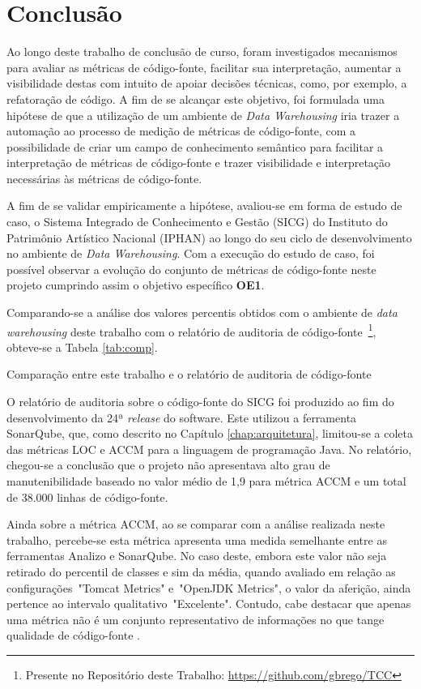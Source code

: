 \chapter{Conclusão}


Ao longo deste trabalho de conclusão de curso, foram investigados mecanismos para avaliar as métricas de código-fonte, facilitar sua interpretação, aumentar a visibilidade destas com intuito de apoiar decisões técnicas, como, por exemplo, a refatoração de código. A fim de se alcançar este objetivo, foi formulada uma hipótese de que a utilização de um ambiente de \textit{Data Warehousing} iria trazer a automação ao processo de medição de métricas de código-fonte, com a possibilidade de criar um campo de conhecimento semântico para facilitar a interpretação de métricas de código-fonte e trazer visibilidade e interpretação necessárias às métricas de código-fonte.

A fim de se validar empiricamente a hipótese, avaliou-se em forma de estudo de caso, o Sistema Integrado de Conhecimento e Gestão (SICG) do Instituto do Patrimônio Artístico Nacional (IPHAN) ao longo do seu ciclo de desenvolvimento no ambiente de \textit{Data Warehousing}. Com a execução do estudo de caso, foi possível observar a evolução do conjunto de métricas de código-fonte neste projeto cumprindo assim o objetivo específico \textbf{OE1}.

Comparando-se a análise dos valores percentis obtidos com o ambiente de \textit{data warehousing} deste trabalho com o relatório de auditoria de código-fonte~\footnote{Presente no Repositório deste Trabalho: \url{https://github.com/gbrego/TCC}}, obteve-se a Tabela \ref{tab:comp}.

\begin{table}[!ht]
\centering

\caption{Comparação entre este trabalho e o relatório de auditoria de código-fonte}
\label{tab:comp}
\end{table}
\FloatBarrier

O relatório de auditoria sobre o código-fonte do SICG foi produzido ao fim do desenvolvimento da 24ª \textit{release} do software. Este utilizou a ferramenta SonarQube, que, como descrito no Capítulo \ref{chap:arquitetura}, limitou-se a coleta das métricas LOC e ACCM para a linguagem de programação Java. No relatório, chegou-se a conclusão que o projeto não apresentava alto grau de manutenibilidade baseado no valor médio de 1,9 para métrica ACCM e um total de 38.000 linhas de código-fonte. 

Ainda sobre a métrica ACCM, ao se comparar com a análise realizada neste trabalho, percebe-se esta métrica apresenta uma medida semelhante entre as ferramentas Analizo e SonarQube. No caso deste, embora este valor não seja retirado do percentil de classes e sim da média, quando avaliado em relação as configurações~"Tomcat Metrics" e~"OpenJDK Metrics", o valor da aferição, ainda pertence ao intervalo qualitativo~"Excelente". Contudo, cabe destacar que apenas uma métrica não é um conjunto representativo de informações no que tange qualidade de código-fonte \cite{Meirelles2013}.


